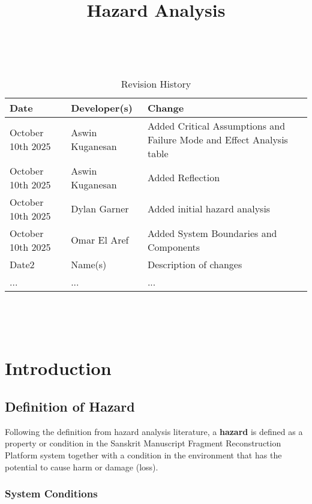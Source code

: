 \documentclass{article}
\title{Hazard Analysis\\\progname}
\author{\authname}
\date{}
\begin{document}
\maketitle
\thispagestyle{empty}

~\newpage


\begin{table}[hp]
\caption{Revision History} \label{TblRevisionHistory}
\begin{tabularx}{\textwidth}{llX}
\toprule
\textbf{Date} & \textbf{Developer(s)} & \textbf{Change}\\
\midrule
October 10th 2025 & Aswin Kuganesan & Added Critical Assumptions and Failure Mode and Effect Analysis table\\
October 10th 2025 & Aswin Kuganesan & Added Reflection\\
October 10th 2025 & Dylan Garner & Added initial hazard analysis\\
October 10th 2025 & Omar El Aref & Added System Boundaries and Components\\
Date2 & Name(s) & Description of changes\\
... & ... & ...\\
\bottomrule
\end{tabularx}
\end{table}

~\newpage

\tableofcontents

~\newpage



\section{Introduction}

\subsection{Definition of Hazard}

Following the definition from hazard analysis literature, a \textbf{hazard} is defined as a property or condition in the Sanskrit Manuscript Fragment Reconstruction Platform system together with a condition in the environment that has the potential to cause harm or damage (loss).

\subsubsection{System Conditions}
\end{document}
